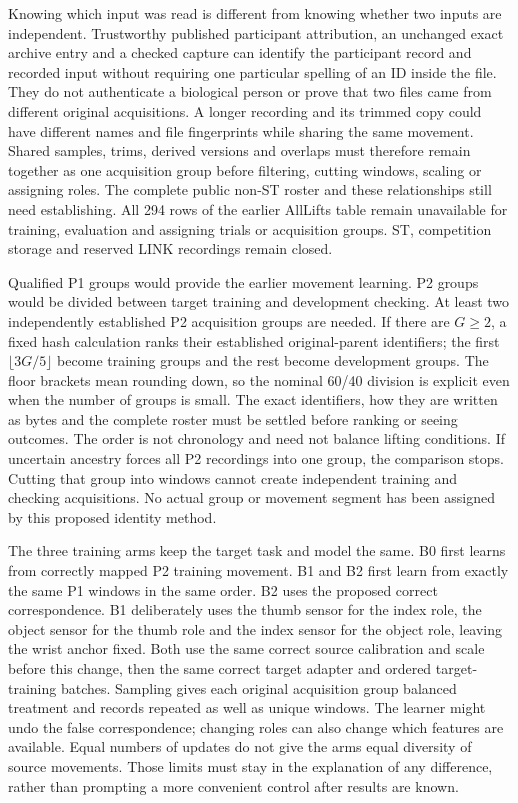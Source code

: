 Knowing which input was read is different from knowing whether two inputs are independent. Trustworthy published participant attribution, an unchanged exact archive entry and a checked capture can identify the participant record and recorded input without requiring one particular spelling of an ID inside the file. They do not authenticate a biological person or prove that two files came from different original acquisitions. A longer recording and its trimmed copy could have different names and file fingerprints while sharing the same movement. Shared samples, trims, derived versions and overlaps must therefore remain together as one acquisition group before filtering, cutting windows, scaling or assigning roles. The complete public non-ST roster and these relationships still need establishing. All 294 rows of the earlier AllLifts table remain unavailable for training, evaluation and assigning trials or acquisition groups. ST, competition storage and reserved LINK recordings remain closed.

Qualified P1 groups would provide the earlier movement learning. P2 groups would be divided between target training and development checking. At least two independently established P2 acquisition groups are needed. If there are $G\geq2$, a fixed hash calculation ranks their established original-parent identifiers; the first $\lfloor3G/5\rfloor$ become training groups and the rest become development groups. The floor brackets mean rounding down, so the nominal 60/40 division is explicit even when the number of groups is small. The exact identifiers, how they are written as bytes and the complete roster must be settled before ranking or seeing outcomes. The order is not chronology and need not balance lifting conditions. If uncertain ancestry forces all P2 recordings into one group, the comparison stops. Cutting that group into windows cannot create independent training and checking acquisitions. No actual group or movement segment has been assigned by this proposed identity method.

The three training arms keep the target task and model the same. B0 first learns from correctly mapped P2 training movement. B1 and B2 first learn from exactly the same P1 windows in the same order. B2 uses the proposed correct correspondence. B1 deliberately uses the thumb sensor for the index role, the object sensor for the thumb role and the index sensor for the object role, leaving the wrist anchor fixed. Both use the same correct source calibration and scale before this change, then the same correct target adapter and ordered target-training batches. Sampling gives each original acquisition group balanced treatment and records repeated as well as unique windows. The learner might undo the false correspondence; changing roles can also change which features are available. Equal numbers of updates do not give the arms equal diversity of source movements. Those limits must stay in the explanation of any difference, rather than prompting a more convenient control after results are known.

